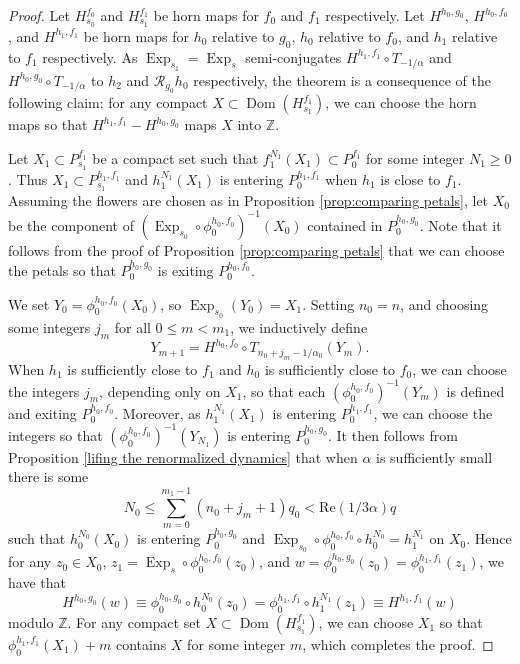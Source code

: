 \documentclass[12pt,letterpaper]{amsart}
\numberwithin{equation}{section}
\theoremstyle{remark}
\theoremstyle{definition}
\newcommand{\Z}{\mathbb Z}
\newcommand{\RR}{\mathcal R}
\DeclareMathOperator{\Dom}{Dom}
\DeclareMathOperator{\Exp}{Exp}
\begin{document}
	
	\begin{proof}
		Let $H^{f_0}_{s_0}$ and $H^{f_1}_{s_1}$ be horn maps for $f_0$ and $f_1$ respectively. 
		Let $H^{h_0, g_0}$, $H^{h_0, f_0}$,  and $H^{h_1, f_1}$ be horn maps for $h_0$ relative to $g_0$, $h_0$ relative to $f_0$, and $h_1$ relative to $f_1$ respectively. As $\Exp_{s_1}= \Exp_{s}$ semi-conjugates $H^{h_1, f_1}\circ T_{-1/\alpha}$ and $H^{h_0, g_0}\circ T_{-1/\alpha}$ to $h_2$ and $\RR_{g_0}h_0$ respectively, the theorem is a consequence of the following  claim: for any compact $X\subset \Dom(H^{f_1}_{s_1})$, we can choose the horn maps so that 
		$H^{h_1, f_1}-H^{h_0, g_0}$ maps $X$ into $\Z$.
		
		Let $X_1\subset P_{s_1}^{f_1}$ be a compact set such that $f_1^{N_1}(X_1)\subset P_0^{f_1}$ 
		for some integer $N_1\geq 0$. 
		Thus $X_1\subset P_{s_1}^{h_1, f_1}$ and $h_1^{N_1}(X_1)$ is entering $P_0^{h_1, f_1}$ when $h_1$ is close to $f_1$. 
		Assuming the flowers are chosen as in Proposition \ref{prop:comparing petals}, let $X_0$ be the component of $(\Exp_{s_0}\circ \phi_0^{h_0, f_0})^{-1}(X_0)$ contained in $P_0^{h_0, g_0}$.
		Note that it follows from the proof of Proposition \ref{prop:comparing petals} that we can choose the petals so that $P_0^{h_0, g_0}$ is exiting $P_0^{h_0, f_0}$.
		
		
		
		We set $Y_0= \phi_0^{h_0, f_0}(X_0)$, so $\Exp_{s_0}(Y_0)= X_1$. 
		Setting $n_0 = n$, and 
		choosing some integers $j_m$ for all $0\leq m < m_1$, we inductively define $$Y_{m+1} = H^{h_0, f_0}\circ T_{n_0+j_m-1/\alpha_0} (Y_m).$$
		When $h_1$ is sufficiently close to $f_1$ and $h_0$ is sufficiently close to $f_0$, we can choose the integers $j_m$, depending only on $X_1$, so that each $(\phi_0^{h_0, f_0})^{-1}(Y_m)$ is defined and exiting $P_0^{h_0, f_0}$. 
		Moreover, as $h_1^{N_1}(X_1)$ is entering $P_0^{h_1, f_1}$, we can choose the integers so that $(\phi_0^{h_0, f_0})^{-1}(Y_{N_1})$ is entering $P_0^{h_0, g_0}$.
		It then follows from Proposition \ref{lifing the renormalized dynamics} that when $\alpha$ is sufficiently small there is some $$N_0\leq \sum_{m=0}^{m_1-1}(n_0+j_m+1)q_0< \text{Re}(1/3\alpha)q$$
		such that $h_0^{N_0}(X_0)$ is entering $P_0^{h_0, g_0}$
		and $\Exp_{s_0}\circ \phi_0^{h_0, f_0}\circ h_0^{N_0} = h_1^{N_1}$ on $X_0$. 
		Hence for any $z_0\in X_0$, $z_1 = \Exp_s\circ \phi_0^{h_0, f_0}(z_0)$, and $w= \phi_0^{h_0, g_0}(z_0) = \phi_0^{h_1, f_1}(z_1)$, we have that 
		$$H^{h_0, g_0}(w) \equiv \phi_0^{h_0, g_0}\circ h_0^{N_0}(z_0) = \phi_0^{h_1, f_1}\circ h_1^{N_1}(z_1)\equiv H^{h_1, f_1}(w)$$
		modulo $\Z$. For any compact set $X\subset \Dom(H^{f_1}_{s_1})$, we can choose $X_1$ so that $\phi_0^{h_1, f_1}(X_1)+m$ contains $X$ for some integer $m$, which completes the proof.
	\end{proof}
	
\end{document}
